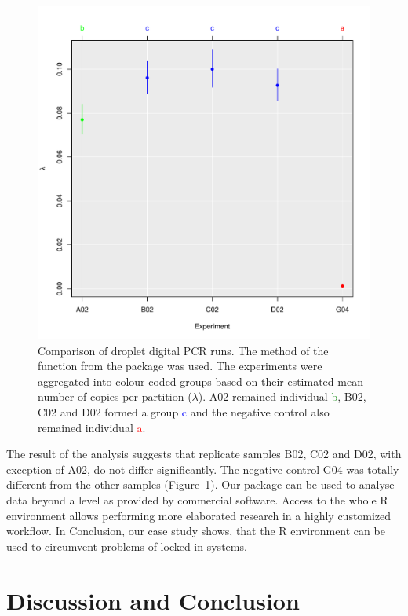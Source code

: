 \begin{figure}[htbp]
  \centering
  \includegraphics[trim=0.75cm 0.75cm 0.75cm 1.75cm, scale=0.5]{figures/test_counts.pdf}
  \caption{Comparison of droplet digital PCR runs. The  method of the 
 function from the  package was used. The 
experiments were aggregated into colour coded groups based on their estimated 
mean number of copies per partition ($\lambda$). A02 remained individual 
\textcolor{green}{b}, B02, C02 and D02 formed a group \textcolor{blue}{c} and 
the negative control also remained individual \textcolor{red}{a}.
}
  \label{figure:test_counts}
\end{figure}

The result of the analysis suggests that replicate samples B02, C02 and D02, with exception of A02,  
do not differ significantly. The negative control G04 was 
totally different from the other samples (Figure~\ref{figure:test_counts}). 
Our  package can be used to analyse data beyond a level as provided by 
commercial software. Access to the whole R environment allows performing 
more elaborated research in a highly customized workflow. In Conclusion, our 
case study shows, that the R environment can be used to circumvent problems of 
locked-in systems.

\section{Discussion and Conclusion}

